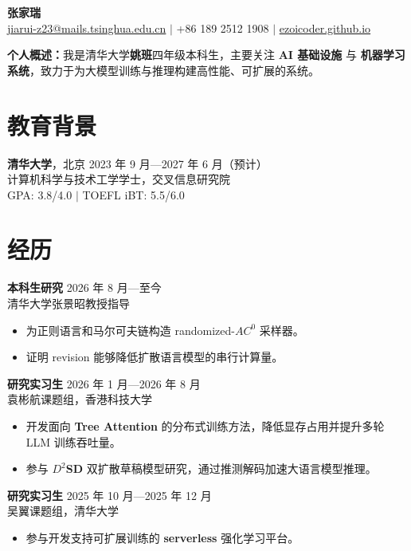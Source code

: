 \documentclass[11pt,a4paper]{article}
\newcommand{\entry}[4]{%
  \textbf{#1} \hfill {\small #2}\\[-1pt]
  #3 \hfill {\small #4}%
}
\begin{document}
\begin{center}
  {\LARGE\bfseries\color{textgray} {张家瑞}}\\[3pt]
  \href{mailto:jiarui-z23@mails.tsinghua.edu.cn}{jiarui-z23@mails.tsinghua.edu.cn}
  \quad $\vert$ \quad +86 189 2512 1908
  \quad $\vert$ \quad \href{https://ezoicoder.github.io}{ezoicoder.github.io}
\end{center}

\vspace{-3pt}
\textbf{个人概述：}我是清华大学\textbf{姚班}四年级本科生，主要关注 \textbf{AI 基础设施} 与 \textbf{机器学习系统}，致力于为大模型训练与推理构建高性能、可扩展的系统。

\section*{教育背景}
\textbf{清华大学}，北京 \hfill {\small 2023 年 9 月—2027 年 6 月（预计）}\\[-1pt]
计算机科学与技术工学学士，交叉信息研究院\\[-1pt]
GPA: 3.8/4.0 \quad $\vert$ \quad TOEFL iBT: 5.5/6.0

\section*{经历}

\entry{本科生研究}{2026 年 8 月—至今}{清华大学张景昭教授指导}{}
\begin{itemize}
  \item 为正则语言和马尔可夫链构造 randomized-$AC^0$ 采样器。
  \item 证明 revision 能够降低扩散语言模型的串行计算量。
\end{itemize}

\entry{研究实习生}{2026 年 1 月—2026 年 8 月}{袁彬航课题组，香港科技大学}{}
\begin{itemize}
  \item 开发面向 \textbf{Tree Attention} 的分布式训练方法，降低显存占用并提升多轮 LLM 训练吞吐量。
  \item 参与 \textbf{$D^2$SD} 双扩散草稿模型研究，通过推测解码加速大语言模型推理。
\end{itemize}

\entry{研究实习生}{2025 年 10 月—2025 年 12 月}{吴翼课题组，清华大学}{}
\begin{itemize}
  \item 参与开发支持可扩展训练的 \textbf{serverless} 强化学习平台。
\end{itemize}
\end{document}

